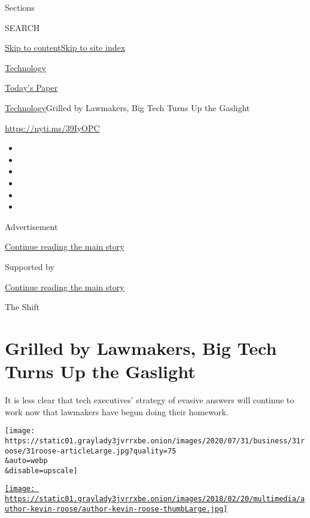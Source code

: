 Sections

SEARCH

\protect\hyperlink{site-content}{Skip to
content}\protect\hyperlink{site-index}{Skip to site index}

\href{https://www.nytimes3xbfgragh.onion/section/technology}{Technology}

\href{https://myaccount.nytimes3xbfgragh.onion/auth/login?response_type=cookie\&client_id=vi}{}

\href{https://www.nytimes3xbfgragh.onion/section/todayspaper}{Today's
Paper}

\href{/section/technology}{Technology}\textbar{}Grilled by Lawmakers,
Big Tech Turns Up the Gaslight

\href{https://nyti.ms/39IyOPC}{https://nyti.ms/39IyOPC}

\begin{itemize}
\item
\item
\item
\item
\item
\item
\end{itemize}

Advertisement

\protect\hyperlink{after-top}{Continue reading the main story}

Supported by

\protect\hyperlink{after-sponsor}{Continue reading the main story}

The Shift

\hypertarget{grilled-by-lawmakers-big-tech-turns-up-the-gaslight}{%
\section{Grilled by Lawmakers, Big Tech Turns Up the
Gaslight}\label{grilled-by-lawmakers-big-tech-turns-up-the-gaslight}}

It is less clear that tech executives' strategy of evasive answers will
continue to work now that lawmakers have begun doing their homework.

\texttt{[image: https://static01.graylady3jvrrxbe.onion/images/2020/07/31/business/31roose/31roose-articleLarge.jpg?quality=75\\\&auto=webp\\\&disable=upscale]}

\href{https://www.nytimes3xbfgragh.onion/by/kevin-roose}{\texttt{[image: https://static01.graylady3jvrrxbe.onion/images/2018/02/20/multimedia/author-kevin-roose/author-kevin-roose-thumbLarge.jpg]}}

